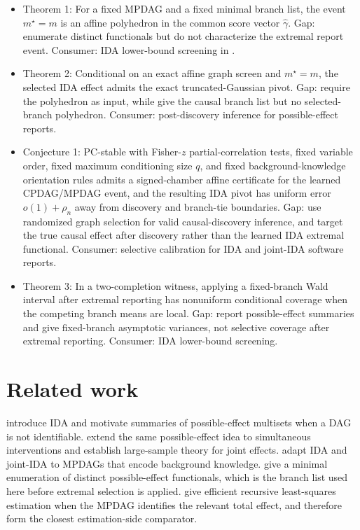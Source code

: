 \documentclass[11pt]{article}
\theoremstyle{definition}
\theoremstyle{plain}
\theoremstyle{remark}
\begin{document}
\begin{itemize}[leftmargin=*]
\item Theorem 1: For a fixed MPDAG and a fixed minimal branch list, the event \(m^\star=m\) is an affine polyhedron in the common score vector \(\hat\gamma\). Gap: \citet{GuoPerkovic2021MinimalEnumeration} enumerate distinct functionals but do not characterize the extremal report event. Consumer: IDA lower-bound screening in \citet{MaathuisKalischBuhlmann2009IDA}.
\item Theorem 2: Conditional on an exact affine graph screen and \(m^\star=m\), the selected IDA effect admits the exact truncated-Gaussian pivot. Gap: \citet{LeeSunSunTaylor2016Polyhedral} require the polyhedron as input, while \citet{GuoPerkovic2021MinimalEnumeration} give the causal branch list but no selected-branch polyhedron. Consumer: post-discovery inference for possible-effect reports.
\item Conjecture 1: PC-stable with Fisher-\(z\) partial-correlation tests, fixed variable order, fixed maximum conditioning size \(q\), and fixed background-knowledge orientation rules admits a signed-chamber affine certificate for the learned CPDAG/MPDAG event, and the resulting IDA pivot has uniform error \(o(1)+\rho_n\) away from discovery and branch-tie boundaries. Gap: \citet[\S2.2]{GraduZrnicWangJordan2025ValidInference} use randomized graph selection for valid causal-discovery inference, and \citet[\S2.1--\S2.2]{ChangGuoMalinsky2026PostSelectionCausalDiscovery} target the true causal effect after discovery rather than the learned IDA extremal functional. Consumer: selective calibration for IDA and joint-IDA software reports.
\item Theorem 3: In a two-completion witness, applying a fixed-branch Wald interval after extremal reporting has nonuniform conditional coverage when the competing branch means are local. Gap: \citet{MaathuisKalischBuhlmann2009IDA} report possible-effect summaries and \citet{NandyMaathuisRichardson2017JointIDA} give fixed-branch asymptotic variances, not selective coverage after extremal reporting. Consumer: IDA lower-bound screening.
\end{itemize}

\section{Related work}
\citet{MaathuisKalischBuhlmann2009IDA} introduce IDA and motivate summaries of possible-effect multisets when a DAG is not identifiable. \citet{NandyMaathuisRichardson2017JointIDA} extend the same possible-effect idea to simultaneous interventions and establish large-sample theory for joint effects. \citet{PerkovicKalischMaathuis2017MPDAG} adapt IDA and joint-IDA to MPDAGs that encode background knowledge. \citet{GuoPerkovic2021MinimalEnumeration} give a minimal enumeration of distinct possible-effect functionals, which is the branch list used here before extremal selection is applied. \citet{GuoPerkovic2022EfficientLS} give efficient recursive least-squares estimation when the MPDAG identifies the relevant total effect, and therefore form the closest estimation-side comparator.
\end{document}
